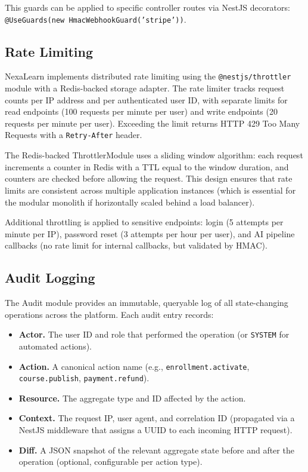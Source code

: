 This guards can be applied to specific controller routes via NestJS decorators: \texttt{@UseGuards(new HmacWebhookGuard('stripe'))}.

\subsection{Rate Limiting}

NexaLearn implements distributed rate limiting using the \texttt{@nestjs/throttler} module with a Redis-backed storage adapter. The rate limiter tracks request counts per IP address and per authenticated user ID, with separate limits for read endpoints (100 requests per minute per user) and write endpoints (20 requests per minute per user). Exceeding the limit returns HTTP 429 Too Many Requests with a \texttt{Retry-After} header.

The Redis-backed ThrottlerModule uses a sliding window algorithm: each request increments a counter in Redis with a TTL equal to the window duration, and counters are checked before allowing the request. This design ensures that rate limits are consistent across multiple application instances (which is essential for the modular monolith if horizontally scaled behind a load balancer).

Additional throttling is applied to sensitive endpoints: login (5 attempts per minute per IP), password reset (3 attempts per hour per user), and AI pipeline callbacks (no rate limit for internal callbacks, but validated by HMAC).

\subsection{Audit Logging}

The Audit module provides an immutable, queryable log of all state-changing operations across the platform. Each audit entry records:

\begin{itemize}
  \item \textbf{Actor.} The user ID and role that performed the operation (or \texttt{SYSTEM} for automated actions).
  \item \textbf{Action.} A canonical action name (e.g., \texttt{enrollment.activate}, \texttt{course.publish}, \texttt{payment.refund}).
  \item \textbf{Resource.} The aggregate type and ID affected by the action.
  \item \textbf{Context.} The request IP, user agent, and correlation ID (propagated via a NestJS middleware that assigns a UUID to each incoming HTTP request).
  \item \textbf{Diff.} A JSON snapshot of the relevant aggregate state before and after the operation (optional, configurable per action type).
\end{itemize}

